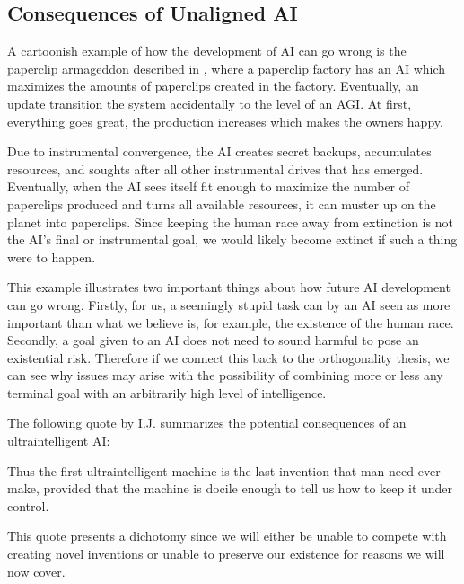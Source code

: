 \documentclass[12pt,A4]{report}
\theoremstyle{definition}
\begin{document}

\subsection{Consequences of Unaligned AI}
A cartoonish example of how the development of AI can go wrong is the paperclip armageddon described in \citet{Bostrom14}, where a paperclip factory has an AI which maximizes the amounts of paperclips created in the factory. Eventually, an update transition the system accidentally to the level of an AGI. At first, everything goes great, the production increases which makes the owners happy. 

Due to instrumental convergence, the AI creates secret backups, accumulates resources, and soughts after all other instrumental drives that has emerged. Eventually, when the AI sees itself fit enough to maximize the number of paperclips produced and turns all available resources, it can muster up on the planet into paperclips. Since keeping the human race away from extinction is not the AI's final or instrumental goal, we would likely become extinct if such a thing were to happen.

This example illustrates two important things about how future AI development can go wrong. Firstly, for us, a seemingly stupid task can by an AI seen as more important than what we believe is, for example, the existence of the human race. Secondly, a goal given to an AI does not need to sound harmful to pose an existential risk. Therefore if we connect this back to the orthogonality thesis, we can see why issues may arise with the possibility of combining more or less any terminal goal with an arbitrarily high level of intelligence. 

The following quote by I.J. \citet[p.33]{IJGood} summarizes the potential consequences of an ultraintelligent AI: 
\begin{displayquote}
Thus the first ultraintelligent machine is the last invention that man need ever make, provided that the machine is docile enough to tell us how to keep it under control.
\end{displayquote}
This quote presents a dichotomy since we will either be unable to compete with creating novel inventions or unable to preserve our existence for reasons we will now cover.
\end{document}
